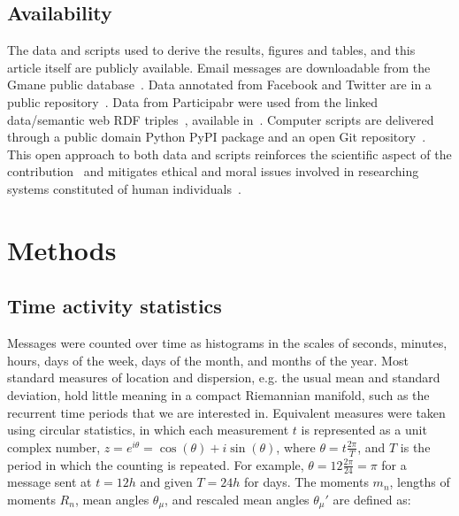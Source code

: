 \documentclass[%
	aip,
	jmp,%
	amsmath,amssymb,
	reprint,%
]{revtex4-1}
\begin{document}
\subsection{Availability}
The data and scripts used to derive the results, figures and tables, and this article itself are publicly available. Email messages are downloadable from the Gmane public database~\cite{Gmanewikipedia}.
Data annotated from Facebook and Twitter are in a public repository~\cite{fbtwData}. Data from Participabr were used from the linked data/semantic web RDF triples~\cite{opa}, available in~\cite{datahub}. Computer scripts are delivered through a public domain Python PyPI package and an open Git repository~\cite{gmanePack}.
This open approach to both data and scripts reinforces the scientific aspect of the contribution~\cite{openSci} and mitigates ethical and moral issues involved in researching systems constituted of human individuals~\cite{anPhy,ccs15}.

\section{Methods}\label{sec:carac}

\subsection{Time activity statistics}\label{sec:mtime}
Messages were counted over time as histograms in the scales of seconds,
minutes, hours, days of the week, days of the month, and months of the year.
Most standard measures of location and dispersion, e.g. the usual mean and
standard deviation, hold little meaning in a compact Riemannian manifold,
such as the recurrent time periods that we are interested in.
Equivalent measures were taken using circular statistics,
in which each measurement $t$ is represented as a unit complex number,
$z=e^{i\theta}=\cos(\theta)+i\sin(\theta)$, where $\theta=t\frac{2\pi}{T}$,
and $T$ is the period in which the counting is repeated.
For example, $\theta=12\frac{2\pi}{24}=\pi$ for a message sent at $t=12h$ and given $T=24h$ for days.
The moments $m_n$, lengths of moments $R_n$, mean angles $\theta_\mu$, and rescaled mean angles $\theta_\mu'$ are defined as:
\end{document}
